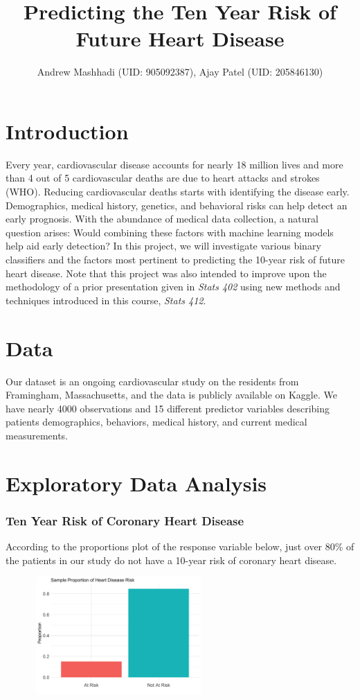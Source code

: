 \documentclass[10pt]{article}
\title{\vspace{-1cm}Predicting the Ten Year Risk of Future Heart Disease}
\author{Andrew Mashhadi (UID: 905092387), Ajay Patel (UID: 205846130)}
\date{}
\begin{document}
\maketitle

\section*{Introduction}

Every year, cardiovascular disease accounts for nearly 18 million lives and more than 4 out of 5 cardiovascular deaths are due to heart attacks and strokes (WHO). Reducing cardiovascular deaths starts with identifying the disease early. Demographics, medical history, genetics, and behavioral risks can help detect an early prognosis. With the abundance of medical data collection, a natural question arises: Would combining these factors with machine learning models help aid early detection? In this project, we will investigate various binary classifiers and the factors most pertinent to predicting the 10-year risk of future heart disease. Note that this project was also intended to improve upon the methodology of a prior presentation given in \textit{Stats 402} using new methods and techniques introduced in this course, \textit{Stats 412}.

\section*{Data}

Our dataset is an ongoing cardiovascular study on the residents from Framingham, Massachusetts, and the data is publicly available on Kaggle. We have nearly 4000 observations and 15 different predictor variables describing patients demographics, behaviors, medical history, and current medical measurements.

\section*{Exploratory Data Analysis}

\subsubsection*{Ten Year Risk of Coronary Heart Disease}

According to the proportions plot of the response variable below, just over 80\% of the patients in our study do not have a 10-year risk of coronary heart disease. 

\begin{figure}[ht!]
\centering
\includegraphics[height=45mm, width=65mm]{bar_chd.png}
\end{figure}
\end{document}
